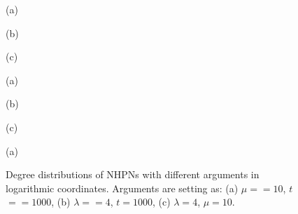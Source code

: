 \documentclass[final]{IEEEtran}
\begin{document}
\begin{figure}[t!]\tiny
\centering
\begin{minipage}[b]{0.3\linewidth}
\centering
\parbox{15.5cm}{\small \hspace{2.5cm}(a)}
\end{minipage}
\begin{minipage}[b]{0.3\linewidth}
    \centering
 \parbox{15.5cm}{\small \hspace{2.5cm}(b)}
\end{minipage}
\begin{minipage}[b]{0.3\linewidth}
    \centering
 \parbox{15.5cm}{\small \hspace{2.5cm}(c) }
\end{minipage}
\hspace{3ex}
 \caption{\label{f9} Degree distributions of HPNs with different arguments in logarithmic coordinates. Arguments are setting as: (a) $\mu$$==$$10$, $t$$==$$1000$, (b) $\lambda$$==$$4$, $t$$=$$1000$, (c) $\lambda$$=$$4$, $\mu$$=$$10$.}
\centering
\begin{minipage}[b]{0.3\linewidth}
\centering
\parbox{15.5cm}{\small \hspace{2.5cm}(a)}
\end{minipage}
\begin{minipage}[b]{0.3\linewidth}
    \centering
 \parbox{15.5cm}{\small \hspace{2.5cm}(b)}
\end{minipage}
\begin{minipage}[b]{0.3\linewidth}
    \centering
 \parbox{15.5cm}{\small \hspace{2.5cm}(c)}
\end{minipage}
\hspace{3ex}
 \caption{\label{f10} Degree distributions of NHPNs with different arguments in logarithmic coordinates. Arguments are setting as: (a) $\mu$$==$$10$, $t$$==$$1000$, (b) $\lambda$$==$$4$, $t$$=$$1000$, (c) $\lambda$$=$$4$, $\mu$$=$$10$.}
\centering
\begin{minipage}[b]{0.3\linewidth}
\centering
\parbox{15.5cm}{\small \hspace{2.5cm}(a) }
\end{minipage}
\begin{minipage}[b]{0.3\linewidth}

\end{minipage}
\end{figure}
\end{document}
